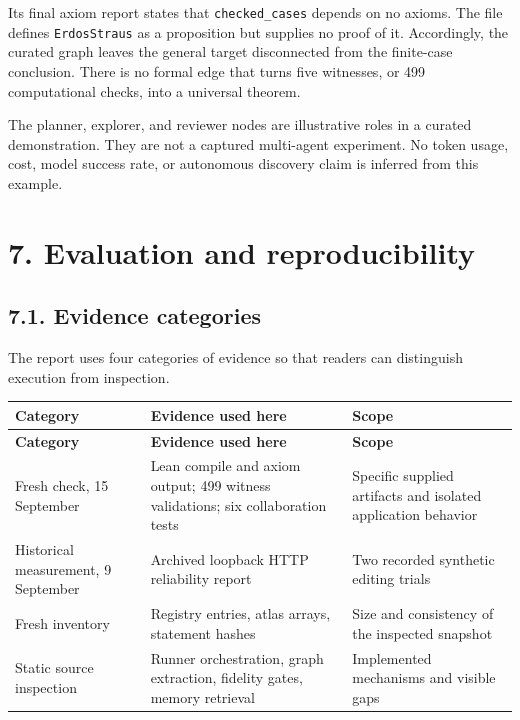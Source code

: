 \documentclass[11pt,a4paper]{article}
\begin{document}
Its final axiom report states that \nolinkurl{checked_cases} depends on no axioms. The file defines \nolinkurl{ErdosStraus} as a proposition but supplies no proof of it. Accordingly, the curated graph leaves the general target disconnected from the finite-case conclusion. There is no formal edge that turns five witnesses, or 499 computational checks, into a universal theorem.

The planner, explorer, and reviewer nodes are illustrative roles in a curated demonstration. They are not a captured multi-agent experiment. No token usage, cost, model success rate, or autonomous discovery claim is inferred from this example.

\section*{7. Evaluation and reproducibility}

\subsection*{7.1. Evidence categories}

The report uses four categories of evidence so that readers can distinguish execution from inspection.

\begingroup\small
\setlength{\tabcolsep}{4pt}
\begin{longtable}{>{\raggedright\arraybackslash}p{0.23\dimexpr\linewidth-6\tabcolsep\relax}>{\raggedright\arraybackslash}p{0.38\dimexpr\linewidth-6\tabcolsep\relax}>{\raggedright\arraybackslash}p{0.39\dimexpr\linewidth-6\tabcolsep\relax}}
\toprule
\textbf{Category} & \textbf{Evidence used here} & \textbf{Scope} \\
\midrule\endfirsthead
\toprule
\textbf{Category} & \textbf{Evidence used here} & \textbf{Scope} \\
\midrule\endhead
\bottomrule\endfoot
Fresh check, 15 September & Lean compile and axiom output; 499 witness validations; six collaboration tests & Specific supplied artifacts and isolated application behavior \\
Historical measurement, 9 September & Archived loopback HTTP reliability report & Two recorded synthetic editing trials \\
Fresh inventory & Registry entries, atlas arrays, statement hashes & Size and consistency of the inspected snapshot \\
Static source inspection & Runner orchestration, graph extraction, fidelity gates, memory retrieval & Implemented mechanisms and visible gaps \\
\end{longtable}
\endgroup
\end{document}

